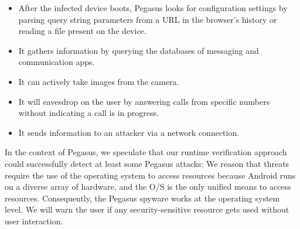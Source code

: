 \begin{itemize}
\item After the infected device boots, Pegasus looks for configuration settings by parsing query string parameters from a URL in the browser's history or reading a file present on the device.
\item It gathers information by querying the databases of messaging and communication apps.
\item It can actively take images from the camera.
\item It will eavesdrop on the user by answering calls from specific numbers without indicating a call is in progress.
\item It sends information to an attacker via a network connection.
\end{itemize}

In the context of Pegasus, we speculate that our runtime verification approach could successfully detect at least some Pegasus attacks:  We reason that threats require the use of the operating system to access resources because Android runs on a diverse array of hardware, and the O/S is the only unified means to access resources.  Consequently, the Pegasus spyware works at the operating system level.  We will warn the user if any security-sensitive resource gets used without user interaction.
